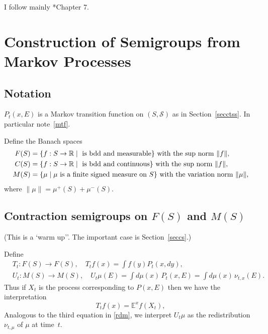 \documentclass[a4paper]{amsart}
\theoremstyle{plain}
\theoremstyle{definition}
\theoremstyle{remark}
\begin{document}
I follow mainly \cite{Lam}*{Chapter  7}.


\section{\textbf{Construction of Semigroups from Markov Processes}}   
 
\subsection{Notation}
$ P_t(x,E) $ is a Markov transition function on $ (S, \mathcal{S} ) $ as in Section~\ref{secctss}. In particular note~\eqref{mtf}. 


 
Define the Banach spaces
\begin{align} 
F(S) & = \{ f:S \to \mathbb{R} \mid   \text{ is bdd and measurable} \} \text{ with the sup norm $ \|f\| $},\label {bsl} \\
C(S)  & = \{ f:S \to \mathbb{R} \mid   \text{ is bdd and continuous} \} \text{ with the sup norm $ \|f\| $},\label {csl} \\
M(S) &= \{ \mu \mid \text{$ \mu $ is a finite signed measure on $ S $}\} \text{ with the variation norm $ \|\mu\| $}, 
\label{bsm}
\end{align} 
where   $ \|\mu\| = \mu^+(S) + \mu^-(S) $. 

 
\subsection{Contraction semigroups on $ F(S) $ and $ M(S) $} (This is a `warm up''. The important case is Section~\ref{seccs}.)

Define 
\begin{align}
&T_t:F(S)\to F(S), \quad  T_tf (x) = \int f(y) P_t(x,dy), \\
& U_t:M(S) \to M(S), \quad  U_t\mu(E) = \int d\mu(x)\, P_t(x,E) =  \int d\mu(x)\, \nu_{t,x}(E).\label{sgu}
\end{align} 
Thus if $ X_t $ is the process corresponding to $ P(x,E) $ then we have the interpretation
\[ T_t f(x) = \mathbb{E} ^x f(X_t ), \]
Analogous to  the third equation in \eqref{rdm},  we  interpret  $ U_t \mu $ as the redistribution $ \nu_{t,\mu} $ of $ \mu $ at time~$ t $.  
\end{document}
